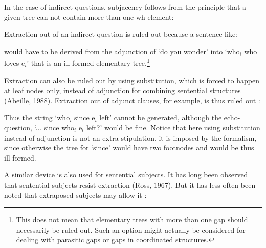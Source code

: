 In the case of indirect questions, subjacency follows from the principle that 
a given tree can not contain more than one wh-element:


Extraction out of an indirect question is ruled out because a sentence like:

\beginsentences
{}
\endsentences

\noindent would have to be derived from the adjunction of `do you wonder' into
`who$_{i}$ who loves e$_{i}$' that is an ill-formed elementary tree.\footnote{This does not mean that elementary
trees with more than one gap should necessarily be ruled out. Such an option  might actually 
be considered for dealing with
parasitic gaps or gaps in coordinated structures.}


Extraction can also be ruled out by using substitution, which is forced to
happen at leaf nodes only, instead of adjunction for combining
sentential structures (Abeille, 1988). Extraction out of adjunct clauses,
for example, is thus ruled out :


\noindent Thus the string `who$_{i}$ since e$_{i}$ left' cannot be generated,
although the echo-question, `... since who$_{i}$ e$_{i}$ left?'
would be fine. Notice that here using substitution instead of adjunction
is  not an extra stipulation, it is imposed by the formalism, since
otherwise the tree for `since' would have two footnodes and would be
thus ill-formed.

A similar device is also used for sentential subjects. It has long been
observed that sentential subjects resist extraction (Ross, 1967)\nocite{ross67}. But it
has less often been noted that extraposed subjects may allow it :

\beginsentences
{}
\endsentences

